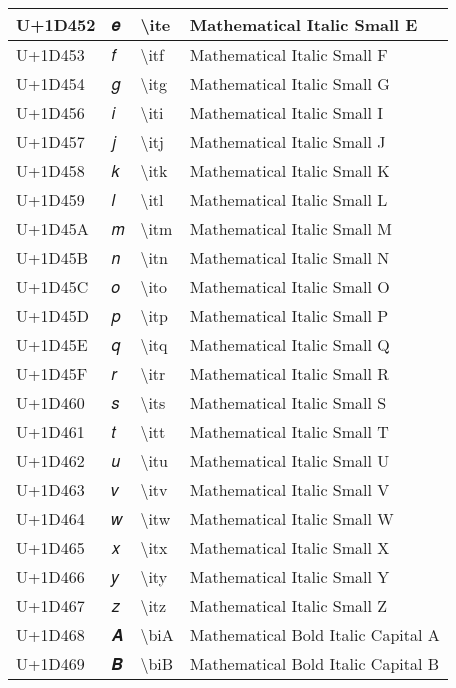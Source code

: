 \begin{table}[h]
\begin{tabulary}{\linewidth}{|L|L|L|L|}
\hline
U+1D452 & 𝑒 & {\textbackslash}ite & Mathematical Italic Small E \\
\hline
U+1D453 & 𝑓 & {\textbackslash}itf & Mathematical Italic Small F \\
\hline
U+1D454 & 𝑔 & {\textbackslash}itg & Mathematical Italic Small G \\
\hline
U+1D456 & 𝑖 & {\textbackslash}iti & Mathematical Italic Small I \\
\hline
U+1D457 & 𝑗 & {\textbackslash}itj & Mathematical Italic Small J \\
\hline
U+1D458 & 𝑘 & {\textbackslash}itk & Mathematical Italic Small K \\
\hline
U+1D459 & 𝑙 & {\textbackslash}itl & Mathematical Italic Small L \\
\hline
U+1D45A & 𝑚 & {\textbackslash}itm & Mathematical Italic Small M \\
\hline
U+1D45B & 𝑛 & {\textbackslash}itn & Mathematical Italic Small N \\
\hline
U+1D45C & 𝑜 & {\textbackslash}ito & Mathematical Italic Small O \\
\hline
U+1D45D & 𝑝 & {\textbackslash}itp & Mathematical Italic Small P \\
\hline
U+1D45E & 𝑞 & {\textbackslash}itq & Mathematical Italic Small Q \\
\hline
U+1D45F & 𝑟 & {\textbackslash}itr & Mathematical Italic Small R \\
\hline
U+1D460 & 𝑠 & {\textbackslash}its & Mathematical Italic Small S \\
\hline
U+1D461 & 𝑡 & {\textbackslash}itt & Mathematical Italic Small T \\
\hline
U+1D462 & 𝑢 & {\textbackslash}itu & Mathematical Italic Small U \\
\hline
U+1D463 & 𝑣 & {\textbackslash}itv & Mathematical Italic Small V \\
\hline
U+1D464 & 𝑤 & {\textbackslash}itw & Mathematical Italic Small W \\
\hline
U+1D465 & 𝑥 & {\textbackslash}itx & Mathematical Italic Small X \\
\hline
U+1D466 & 𝑦 & {\textbackslash}ity & Mathematical Italic Small Y \\
\hline
U+1D467 & 𝑧 & {\textbackslash}itz & Mathematical Italic Small Z \\
\hline
U+1D468 & 𝑨 & {\textbackslash}biA & Mathematical Bold Italic Capital A \\
\hline
U+1D469 & 𝑩 & {\textbackslash}biB & Mathematical Bold Italic Capital B \\

\end{tabulary}
\end{table}
